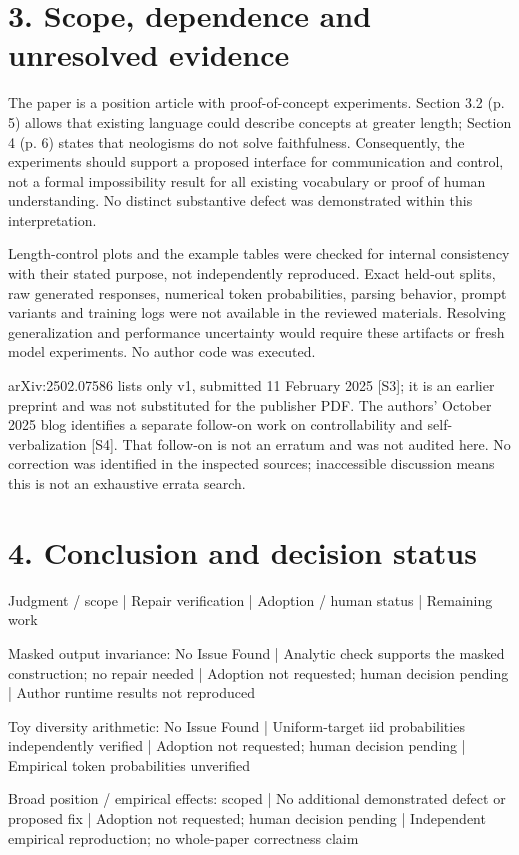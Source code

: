 \documentclass[10pt]{article}
\begin{document}
\section*{3. Scope, dependence and unresolved evidence}
The paper is a position article with proof-of-concept experiments. Section 3.2 (p. 5) allows that existing language could describe concepts at greater length; Section 4 (p. 6) states that neologisms do not solve faithfulness. Consequently, the experiments should support a proposed interface for communication and control, not a formal impossibility result for all existing vocabulary or proof of human understanding. No distinct substantive defect was demonstrated within this interpretation.\par
Length-control plots and the example tables were checked for internal consistency with their stated purpose, not independently reproduced. Exact held-out splits, raw generated responses, numerical token probabilities, parsing behavior, prompt variants and training logs were not available in the reviewed materials. Resolving generalization and performance uncertainty would require these artifacts or fresh model experiments. No author code was executed.\par
arXiv:2502.07586 lists only v1, submitted 11 February 2025 [S3]; it is an earlier preprint and was not substituted for the publisher PDF. The authors’ October 2025 blog identifies a separate follow-on work on controllability and self-verbalization [S4]. That follow-on is not an erratum and was not audited here. No correction was identified in the inspected sources; inaccessible discussion means this is not an exhaustive errata search.\par
\section*{4. Conclusion and decision status}
Judgment / scope | Repair verification | Adoption / human status | Remaining work\par
Masked output invariance: No Issue Found | Analytic check supports the masked construction; no repair needed | Adoption not requested; human decision pending | Author runtime results not reproduced\par
Toy diversity arithmetic: No Issue Found | Uniform-target iid probabilities independently verified | Adoption not requested; human decision pending | Empirical token probabilities unverified\par
Broad position / empirical effects: scoped | No additional demonstrated defect or proposed fix | Adoption not requested; human decision pending | Independent empirical reproduction; no whole-paper correctness claim\par
\end{document}
